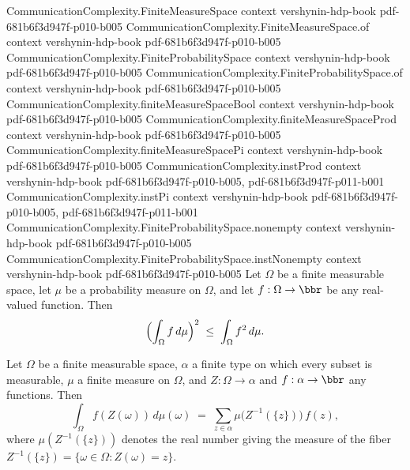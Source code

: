 \begin{theorem}
\label{CommunicationComplexity.FiniteMeasureSpace.sq_integral_le_integral_sq}
\leanok
{}
\proofstep
  {CommunicationComplexity.FiniteMeasureSpace}
  {context}
  {vershynin-hdp-book}
  {pdf-681b6f3d947f-p010-b005}
\proofstep
  {CommunicationComplexity.FiniteMeasureSpace.of}
  {context}
  {vershynin-hdp-book}
  {pdf-681b6f3d947f-p010-b005}
\proofstep
  {CommunicationComplexity.FiniteProbabilitySpace}
  {context}
  {vershynin-hdp-book}
  {pdf-681b6f3d947f-p010-b005}
\proofstep
  {CommunicationComplexity.FiniteProbabilitySpace.of}
  {context}
  {vershynin-hdp-book}
  {pdf-681b6f3d947f-p010-b005}
\proofstep
  {CommunicationComplexity.finiteMeasureSpaceBool}
  {context}
  {vershynin-hdp-book}
  {pdf-681b6f3d947f-p010-b005}
\proofstep
  {CommunicationComplexity.finiteMeasureSpaceProd}
  {context}
  {vershynin-hdp-book}
  {pdf-681b6f3d947f-p010-b005}
\proofstep
  {CommunicationComplexity.finiteMeasureSpacePi}
  {context}
  {vershynin-hdp-book}
  {pdf-681b6f3d947f-p010-b005}
\proofstep
  {CommunicationComplexity.instProd}
  {context}
  {vershynin-hdp-book}
  {pdf-681b6f3d947f-p010-b005,
    pdf-681b6f3d947f-p011-b001}
\proofstep
  {CommunicationComplexity.instPi}
  {context}
  {vershynin-hdp-book}
  {pdf-681b6f3d947f-p010-b005,
    pdf-681b6f3d947f-p011-b001}
\proofstep
  {CommunicationComplexity.FiniteProbabilitySpace.nonempty}
  {context}
  {vershynin-hdp-book}
  {pdf-681b6f3d947f-p010-b005}
\proofstep
  {CommunicationComplexity.FiniteProbabilitySpace.instNonempty}
  {context}
  {vershynin-hdp-book}
  {pdf-681b6f3d947f-p010-b005}
Let $\Omega$ be a finite measurable space, let $\mu$ be a probability measure on
$\Omega$, and let $f : \Omega \to \bbr$ be any real-valued function. Then
\[
  \Bigl(\int_\Omega f\,d\mu\Bigr)^{2} \;\le\; \int_\Omega f^{2}\,d\mu.
\]
\end{theorem}

\begin{theorem}
\label{CommunicationComplexity.FiniteMeasureSpace.integral_comp_eq_sum_measureReal_fibers}
\leanok
{}
Let $\Omega$ be a finite measurable space, $\alpha$ a finite type on which every subset
is measurable, $\mu$ a finite measure on $\Omega$, and $Z : \Omega \to \alpha$ and $f :
\alpha \to \bbr$ any functions. Then
\[
  \int_\Omega f(Z(\omega))\,d\mu(\omega)
  \;=\; \sum_{z \in \alpha} \mu\bigl(Z^{-1}(\{z\})\bigr)\, f(z),
\]
where $\mu(Z^{-1}(\{z\}))$ denotes the real number giving the measure of the fiber
$Z^{-1}(\{z\}) = \{\omega \in \Omega : Z(\omega) = z\}$.
\end{theorem}

